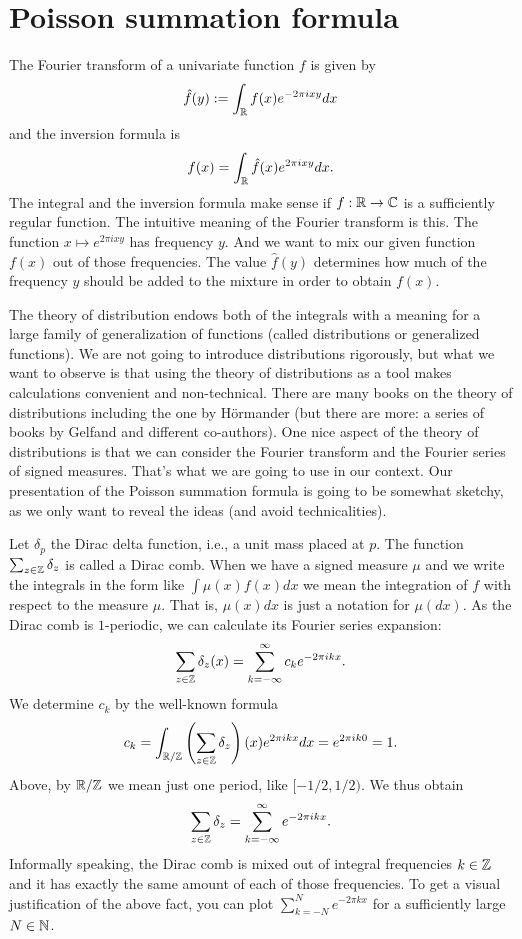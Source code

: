 \section{Poisson summation formula} 

The Fourier transform of a univariate function $f$ is given by 
\begin{equation} \label{fourier:transform} 
	\hat{f} (y) := \int_{\mathbb{R}} f(x) e^{-2 \pi i x y} d x
\end{equation} 
and the inversion formula is 
\begin{equation} \label{inverse:fourier:transform} 
	f(x) = \int_{\mathbb{R}} \hat{f}(x) e^{2  \pi i x y} d x. 
\end{equation} 
The integral and the inversion formula make sense if $f: \mathbb{R} \to \mathbb{C}$ is a sufficiently regular function. The intuitive meaning of the Fourier transform is this. The function $x \mapsto e^{2 \pi i x y}$ has frequency $y$. And we want to mix our given function $f(x)$ out of those  frequencies. The value $\hat{f}(y)$ determines how much of the frequency $y$ should be added to the mixture in order to obtain $f(x)$. 

The theory of distribution endows both of the integrals with a meaning for a large family of generalization of functions (called distributions or generalized functions). We are not going to introduce distributions rigorously, but what we want to observe is that using the theory of distributions as a tool makes calculations convenient and non-technical. There are many books on the theory of distributions including the one by H\"ormander (but there are more: a series of books by Gelfand and different co-authors). One nice aspect of the theory of distributions is that we can consider the Fourier transform and the Fourier series of signed measures. That's what we are going to use in our context. Our presentation of the Poisson summation formula is going to be somewhat sketchy, as we only want to reveal the ideas (and avoid technicalities). 

Let $\delta_p$ the Dirac delta function, i.e., a unit mass placed at $p$. The function $ \sum_{z \in \mathbb{Z}} \delta_z$ is called a Dirac comb. When we have a signed measure $\mu$ and we write the integrals in the form like $\int \mu(x) f(x) d x$ we mean the integration of $f$ with respect to the measure $\mu$. That is, $\mu(x) d x$ is just a notation for $\mu( d x)$. As the Dirac comb is $1$-periodic, we can calculate its Fourier series expansion:
\[
	\sum_{z \in \mathbb{Z}} \delta_z(x) = \sum_{k=-\infty}^\infty c_k e^{-2 \pi i k x}. 
\] 
We determine $c_k$ by the well-known formula 
\[
	c_k  = \int_{\mathbb{R} / \mathbb{Z}} \left(\sum_{z \in \mathbb{Z}} \delta_z\right)(x) e^{2 \pi i kx} d x = e^{2 \pi i k 0} = 1. 
\]
Above, by $\mathbb{R}/ \mathbb{Z}$ we mean just one period, like $[-1/2,1/2)$. We thus obtain 
\begin{equation} \label{fourier:dirac:comb} 
	\sum_{z \in \mathbb{Z}} \delta_z = \sum_{k=-\infty}^\infty e^{ - 2 \pi i k x}. 
\end{equation} 
Informally speaking, the Dirac comb is mixed out of integral frequencies $k \in \mathbb{Z}$ and it has exactly the same amount of each of those frequencies. To get a visual justification of the above fact, you can plot $\sum_{k=-N}^N e^{ - 2\pi k x}$ for a sufficiently large $N \in \mathbb{N}$. 

